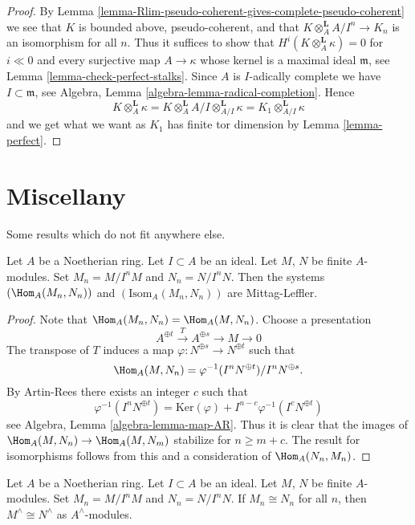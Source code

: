 \begin{proof}
By Lemma \ref{lemma-Rlim-pseudo-coherent-gives-complete-pseudo-coherent}
we see that $K$ is bounded above, pseudo-coherent, and that
$K \otimes_A^\mathbf{L} A/I^n \to K_n$ is an isomorphism for all $n$.
Thus it suffices to show that $H^i(K \otimes_A^\mathbf{L} \kappa) = 0$ for
$i \ll 0$ and every surjective map $A \to \kappa$ whose kernel is
a maximal ideal $\mathfrak m$, see
Lemma \ref{lemma-check-perfect-stalks}.
Since $A$ is $I$-adically complete we have $I \subset \mathfrak m$, see
Algebra, Lemma \ref{algebra-lemma-radical-completion}.
Hence
$$
K \otimes_A^\mathbf{L} \kappa =
K \otimes_A^\mathbf{L} A/I \otimes_{A/I}^\mathbf{L} \kappa =
K_1 \otimes_{A/I}^\mathbf{L} \kappa
$$
and we get what we want as $K_1$ has finite tor dimension by
Lemma \ref{lemma-perfect}.
\end{proof}






\section{Miscellany}
\label{section-misc}

\noindent
Some results which do not fit anywhere else.

\begin{lemma}
\label{lemma-hom-systems-ML}
Let $A$ be a Noetherian ring. Let $I \subset A$ be an ideal. Let $M$, $N$ be
finite $A$-modules. Set $M_n = M/I^nM$ and $N_n = N/I^nN$. Then
the systems $(\Hom_A(M_n, N_n))$ and $(\text{Isom}_A(M_n, N_n))$
are Mittag-Leffler.
\end{lemma}

\begin{proof}
Note that $\Hom_A(M_n, N_n) = \Hom_A(M, N_n)$. Choose a presentation
$$
A^{\oplus t} \xrightarrow{T} A^{\oplus s} \to M \to 0
$$
The transpose of $T$ induces a map $\varphi : N^{\oplus s} \to N^{\oplus t}$
such that
$$
\Hom_A(M, N_n) = \varphi^{-1}(I^nN^{\oplus t})/I^nN^{\oplus s}.
$$
By Artin-Rees there exists an integer $c$ such that
$$
\varphi^{-1}(I^nN^{\oplus t}) =
\text{Ker}(\varphi) + I^{n - c}\varphi^{-1}(I^cN^{\oplus t})
$$
see Algebra, Lemma \ref{algebra-lemma-map-AR}. Thus it is clear that
the images of $\Hom_A(M, N_n) \to \Hom_A(M, N_m)$ stabilize for
$n \geq m + c$. The result for isomorphisms follows from this
and a consideration of $\Hom_A(N_n, M_n)$.
\end{proof}

\begin{lemma}
\label{lemma-isomorphic-completions}
Let $A$ be a Noetherian ring. Let $I \subset A$ be an ideal. Let $M$, $N$ be
finite $A$-modules. Set $M_n = M/I^nM$ and $N_n = N/I^nN$. If
$M_n \cong N_n$ for all $n$, then $M^\wedge \cong N^\wedge$
as $A^\wedge$-modules.
\end{lemma}

